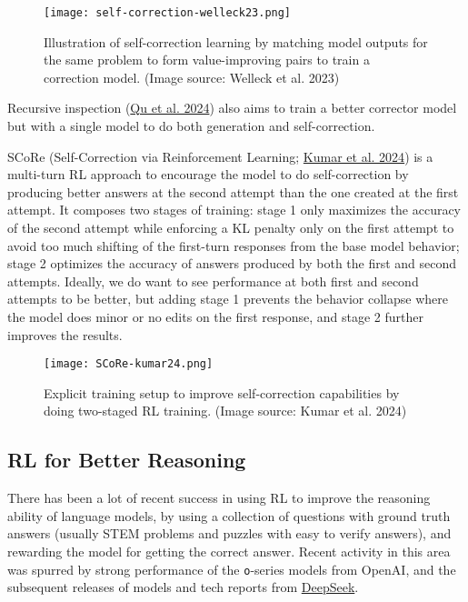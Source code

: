 \documentclass[12pt]{article}
\begin{document}
\begin{figure}[h]
    \centering
    \texttt{[image: self-correction-welleck23.png]}
    \caption{Illustration of self-correction learning by matching model outputs for the same problem to form value-improving pairs to train a correction model. (Image source: Welleck et al. 2023)}
\end{figure}

Recursive inspection (\href{https://arxiv.org/abs/2407.18219}{Qu et al. 2024}) also aims to train a better corrector model but with a single model to do both generation and self-correction.

SCoRe (Self-Correction via Reinforcement Learning; \href{https://arxiv.org/abs/2409.12917}{Kumar et al. 2024}) is a multi-turn RL approach to encourage the model to do self-correction by producing better answers at the second attempt than the one created at the first attempt. It composes two stages of training: stage 1 only maximizes the accuracy of the second attempt while enforcing a KL penalty only on the first attempt to avoid too much shifting of the first-turn responses from the base model behavior; stage 2 optimizes the accuracy of answers produced by both the first and second attempts. Ideally, we do want to see performance at both first and second attempts to be better, but adding stage 1 prevents the behavior collapse where the model does minor or no edits on the first response, and stage 2 further improves the results.

\begin{figure}[h]
    \centering
    \texttt{[image: SCoRe-kumar24.png]}
    \caption{Explicit training setup to improve self-correction capabilities by doing two-staged RL training. (Image source: Kumar et al. 2024)}
\end{figure}

\subsection{RL for Better Reasoning}

There has been a lot of recent success in using RL to improve the reasoning ability of language models, by using a collection of questions with ground truth answers (usually STEM problems and puzzles with easy to verify answers), and rewarding the model for getting the correct answer. Recent activity in this area was spurred by strong performance of the \texttt{o}-series models from OpenAI, and the subsequent releases of models and tech reports from \href{https://www.deepseek.com/}{DeepSeek}.
\end{document}
